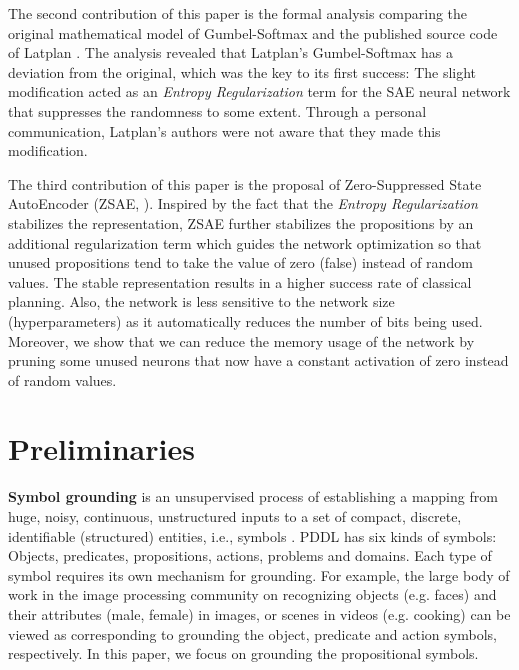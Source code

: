 The second contribution of this paper is the formal analysis comparing
the original mathematical model of Gumbel-Softmax
\cite{jang2016categorical} and the published source code of Latplan
\cite{Asai2018}. The analysis revealed that Latplan's Gumbel-Softmax has a deviation from
the original, which was the key to its first success: The slight
modification acted as an \emph{Entropy Regularization} term for the SAE neural
network that suppresses the randomness to some extent.  Through a personal
communication, Latplan's authors were not aware that they made this modification.

The third contribution of this paper is
the proposal of Zero-Suppressed State AutoEncoder (ZSAE, ).
Inspired by the fact that the \emph{Entropy Regularization} stabilizes the representation,
ZSAE further stabilizes the propositions 
by an additional regularization term which
guides the network optimization so that unused propositions tend to 
take the value of zero (false) instead of random values.
% 
The stable representation results in a higher success rate of classical planning.
Also, the network is less sensitive to the network size (hyperparameters)
as it automatically reduces the number of bits being used.
Moreover, we show that we can reduce the memory usage of the network
by pruning some unused neurons
that now have a constant activation of zero instead of random values.



\section{Preliminaries}
\label{background}

\textbf{Symbol grounding} is an unsupervised process of establishing a mapping
from huge, noisy, continuous, unstructured inputs
to a set of compact, %
discrete, identifiable (structured) entities, i.e., symbols \cite{harnad1990symbol,taddeo2005solving,Steels2008,Asai2018}.
PDDL \cite{McDermott00} has six kinds of symbols: Objects, predicates, propositions, actions, problems and domains.
Each type of symbol requires its own mechanism for grounding.
For example, the large body of work in the image processing community on recognizing 
objects (e.g. faces) and their attributes (male, female) in images, or scenes in videos (e.g. cooking)
can be viewed as corresponding to grounding the object, predicate and action symbols, respectively.
In this paper, we focus on grounding the propositional symbols.

